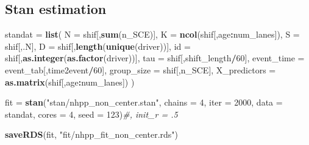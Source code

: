 \documentclass[]{article}
\newenvironment{Shaded}{\begin{snugshade}}{\end{snugshade}}
\newcommand{\CommentTok}[1]{\textcolor[rgb]{0.56,0.35,0.01}{\textit{#1}}}
\newcommand{\DataTypeTok}[1]{\textcolor[rgb]{0.13,0.29,0.53}{#1}}
\newcommand{\DecValTok}[1]{\textcolor[rgb]{0.00,0.00,0.81}{#1}}
\newcommand{\ErrorTok}[1]{\textcolor[rgb]{0.64,0.00,0.00}{\textbf{#1}}}
\newcommand{\KeywordTok}[1]{\textcolor[rgb]{0.13,0.29,0.53}{\textbf{#1}}}
\newcommand{\NormalTok}[1]{#1}
\newcommand{\OperatorTok}[1]{\textcolor[rgb]{0.81,0.36,0.00}{\textbf{#1}}}
\newcommand{\StringTok}[1]{\textcolor[rgb]{0.31,0.60,0.02}{#1}}
\begin{document}
\begin{Shaded}
\end{Shaded}

\hypertarget{stan-estimation}{%
\subsection{Stan estimation}\label{stan-estimation}}

\begin{Shaded}
\begin{Highlighting}[]
\NormalTok{standat =}\StringTok{ }\KeywordTok{list}\NormalTok{(}
  \DataTypeTok{N =}\NormalTok{ shif[,}\KeywordTok{sum}\NormalTok{(n_SCE)],}
  \DataTypeTok{K =} \KeywordTok{ncol}\NormalTok{(shif[,age}\OperatorTok{:}\NormalTok{num_lanes]),}
  \DataTypeTok{S =}\NormalTok{ shif[,.N],}
  \DataTypeTok{D =}\NormalTok{ shif[,}\KeywordTok{length}\NormalTok{(}\KeywordTok{unique}\NormalTok{(driver))],}
  \DataTypeTok{id =}\NormalTok{ shif[,}\KeywordTok{as.integer}\NormalTok{(}\KeywordTok{as.factor}\NormalTok{(driver))],}
  \DataTypeTok{tau =}\NormalTok{ shif[,shift_length}\OperatorTok{/}\DecValTok{60}\NormalTok{],}
  \DataTypeTok{event_time =}\NormalTok{ event_tab[,time2event}\OperatorTok{/}\DecValTok{60}\NormalTok{],}
  \DataTypeTok{group_size =}\NormalTok{ shif[,n_SCE],}
  \DataTypeTok{X_predictors =} \KeywordTok{as.matrix}\NormalTok{(shif[,age}\OperatorTok{:}\NormalTok{num_lanes])}
\NormalTok{)}

\NormalTok{fit =}\StringTok{ }\KeywordTok{stan}\NormalTok{(}\StringTok{"stan/nhpp_non_center.stan"}\NormalTok{,}
         \DataTypeTok{chains =} \DecValTok{4}\NormalTok{, }\DataTypeTok{iter =} \DecValTok{2000}\NormalTok{, }\DataTypeTok{data =}\NormalTok{ standat, }
         \DataTypeTok{cores =} \DecValTok{4}\NormalTok{, }\DataTypeTok{seed =} \DecValTok{123}\NormalTok{)}\CommentTok{#, init_r = .5}

\KeywordTok{saveRDS}\NormalTok{(fit, }\StringTok{"fit/nhpp_fit_non_center.rds"}\NormalTok{)}
\end{Highlighting}
\end{Shaded}
\end{document}

